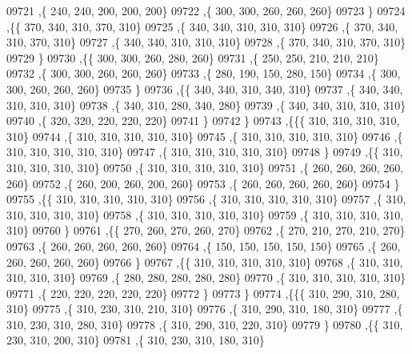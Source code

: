 \begin{DoxyCode}
09721     ,\{   240,   240,   200,   200,   200\}
09722     ,\{   300,   300,   260,   260,   260\}
09723     \}
09724    ,\{\{   370,   340,   310,   370,   310\}
09725     ,\{   340,   340,   310,   310,   310\}
09726     ,\{   370,   340,   310,   370,   310\}
09727     ,\{   340,   340,   310,   310,   310\}
09728     ,\{   370,   340,   310,   370,   310\}
09729     \}
09730    ,\{\{   300,   300,   260,   280,   260\}
09731     ,\{   250,   250,   210,   210,   210\}
09732     ,\{   300,   300,   260,   260,   260\}
09733     ,\{   280,   190,   150,   280,   150\}
09734     ,\{   300,   300,   260,   260,   260\}
09735     \}
09736    ,\{\{   340,   340,   310,   340,   310\}
09737     ,\{   340,   340,   310,   310,   310\}
09738     ,\{   340,   310,   280,   340,   280\}
09739     ,\{   340,   340,   310,   310,   310\}
09740     ,\{   320,   320,   220,   220,   220\}
09741     \}
09742    \}
09743   ,\{\{\{   310,   310,   310,   310,   310\}
09744     ,\{   310,   310,   310,   310,   310\}
09745     ,\{   310,   310,   310,   310,   310\}
09746     ,\{   310,   310,   310,   310,   310\}
09747     ,\{   310,   310,   310,   310,   310\}
09748     \}
09749    ,\{\{   310,   310,   310,   310,   310\}
09750     ,\{   310,   310,   310,   310,   310\}
09751     ,\{   260,   260,   260,   260,   260\}
09752     ,\{   260,   200,   260,   200,   260\}
09753     ,\{   260,   260,   260,   260,   260\}
09754     \}
09755    ,\{\{   310,   310,   310,   310,   310\}
09756     ,\{   310,   310,   310,   310,   310\}
09757     ,\{   310,   310,   310,   310,   310\}
09758     ,\{   310,   310,   310,   310,   310\}
09759     ,\{   310,   310,   310,   310,   310\}
09760     \}
09761    ,\{\{   270,   260,   270,   260,   270\}
09762     ,\{   270,   210,   270,   210,   270\}
09763     ,\{   260,   260,   260,   260,   260\}
09764     ,\{   150,   150,   150,   150,   150\}
09765     ,\{   260,   260,   260,   260,   260\}
09766     \}
09767    ,\{\{   310,   310,   310,   310,   310\}
09768     ,\{   310,   310,   310,   310,   310\}
09769     ,\{   280,   280,   280,   280,   280\}
09770     ,\{   310,   310,   310,   310,   310\}
09771     ,\{   220,   220,   220,   220,   220\}
09772     \}
09773    \}
09774   ,\{\{\{   310,   290,   310,   280,   310\}
09775     ,\{   310,   230,   310,   210,   310\}
09776     ,\{   310,   290,   310,   180,   310\}
09777     ,\{   310,   230,   310,   280,   310\}
09778     ,\{   310,   290,   310,   220,   310\}
09779     \}
09780    ,\{\{   310,   230,   310,   200,   310\}
09781     ,\{   310,   230,   310,   180,   310\}

\end{DoxyCode}
